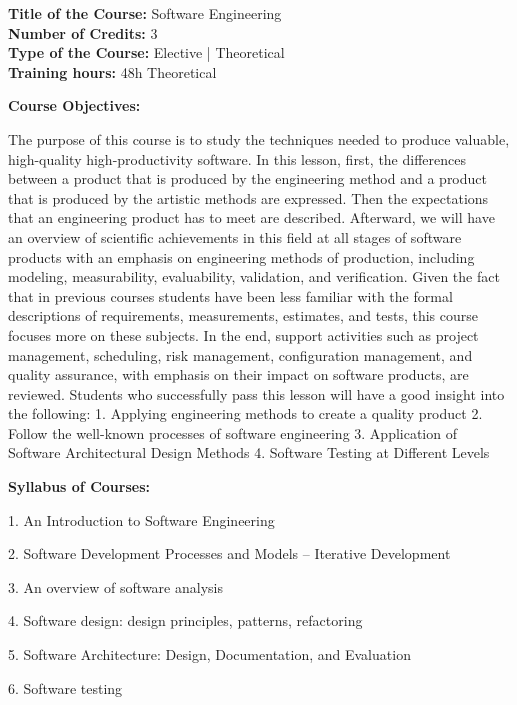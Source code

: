 \documentclass[12pt,a4paper]{article}
\begin{document}
\newpage
\textbf{Title of the Course:} Software Engineering\\
\textbf{Number of Credits:} 3\\
\textbf{Type of the Course:} Elective | Theoretical\\
\textbf{Training hours:} 48h Theoretical\par\vspace{4pt}
\textbf{Course Objectives:}\par\vspace{2pt}
The purpose of this course is to study the techniques needed to produce valuable, high-quality
high-productivity software. In this lesson, first, the differences between a product that is produced
by the engineering method and a product that is produced by the artistic methods are expressed.
Then the expectations that an engineering product has to meet are described. Afterward, we will
have an overview of scientific achievements in this field at all stages of software products with an
emphasis on engineering methods of production, including modeling, measurability, evaluability,
validation, and verification. Given the fact that in previous courses students have been less familiar
with the formal descriptions of requirements, measurements, estimates, and tests, this course
focuses more on these subjects. In the end, support activities such as project management,
scheduling, risk management, configuration management, and quality assurance, with emphasis
on their impact on software products, are reviewed. Students who successfully pass this lesson will
have a good insight into
the following:
1. Applying engineering methods to create a quality product
2. Follow the well-known processes of software engineering
3. Application of Software Architectural Design Methods
4. Software Testing at Different Levels\par\vspace{4pt}
\textbf{Syllabus of Courses:}\par\vspace{2pt}
1. An Introduction to Software Engineering\par
2. Software Development Processes and Models – Iterative Development\par
3. An overview of software analysis\par
4. Software design: design principles, patterns, refactoring\par
5. Software Architecture: Design, Documentation, and Evaluation\par
6. Software testing\par
\end{document}
